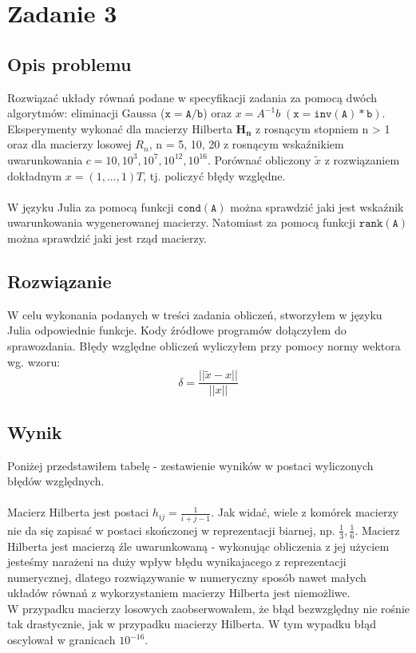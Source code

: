\section{Zadanie 3}
\subsection{Opis problemu}
Rozwiązać układy równań podane w specyfikacji zadania za pomocą dwóch algorytmów: eliminacji Gaussa ($ \mathtt{x=A/b} $) oraz $ x = A^{-1}b\; (\mathtt{x=inv(A)*b}) $. Eksperymenty wykonać dla macierzy Hilberta $\mathbf{H_n}$ z rosnącym stopniem n > 1 oraz dla macierzy losowej $R_n$, n = 5, 10, 20 z rosnącym wskaźnikiem uwarunkowania $ c = 10, 10^3, 10^7, 10^{12}, 10^{16} $. Porównać obliczony $\tilde{x}$ z rozwiązaniem dokładnym $ x = (1, . . . , 1)T $, tj. policzyć błędy względne. \\ \\
W języku Julia za pomocą funkcji $ \mathtt{cond(A)} $ można sprawdzić jaki jest wskaźnik uwarunkowania wygenerowanej macierzy. Natomiast za pomocą funkcji $ \mathtt{rank(A)} $ można sprawdzić jaki jest rząd macierzy.
\subsection{Rozwiązanie}
W celu wykonania podanych w treści zadania obliczeń, stworzyłem w języku Julia odpowiednie funkcje. Kody źródłowe programów dołączyłem do sprawozdania. Błędy względne obliczeń wyliczyłem przy pomocy normy wektora wg. wzoru:
$$ \delta = \frac{|| \widetilde{x} - x ||}{||x||} $$
\subsection{Wynik}
Poniżej przedstawiłem tabelę - zestawienie wyników w postaci wyliczonych błędów względnych. \\\\
Macierz Hilberta jest postaci $ h_{ij} = \frac{1}{i + j - 1}$. Jak widać, wiele z komórek macierzy nie da się zapisać w postaci skończonej w reprezentacji biarnej, np. $ \frac{1}{3}, \frac{1}{6} $. Macierz Hilberta jest macierzą źle uwarunkowaną - wykonując obliczenia z jej użyciem jesteśmy narażeni na duży wpływ błędu wynikajacego z reprezentacji numerycznej, dlatego rozwiązywanie w numeryczny sposób nawet małych układów równań z wykorzystaniem macierzy Hilberta jest niemożliwe. \\
W przypadku macierzy losowych zaobserwowałem, że błąd bezwzględny nie rośnie tak drastycznie, jak w przypadku macierzy Hilberta. W tym wypadku błąd oscylował w granicach $ 10^{-16} $.
\begin{center}

\end{center}

